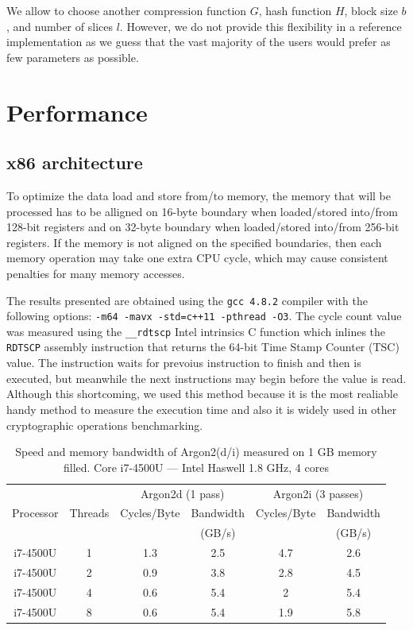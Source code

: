 \documentclass[a4paper]{article}
\begin{document}
We allow to choose another compression function $G$, hash function $H$, block size $b$, and number of slices $l$. However, we do not provide this flexibility in a reference implementation as we guess that
the vast majority of the users would prefer as few parameters as possible.



\section{Performance}

\subsection{x86 architecture}
To optimize the data load and store from/to memory, the memory that will be processed has to be alligned on 16-byte boundary when loaded/stored into/from 128-bit registers and on 32-byte boundary when loaded/stored into/from 256-bit registers. If the memory is not aligned on the specified boundaries, then each memory operation may take one extra CPU cycle, which may cause consistent penalties for many memory accesses.


The results presented are obtained using the \texttt{gcc 4.8.2} compiler  with the following options: \texttt{-m64 -mavx -std=c++11 -pthread -O3}.
The cycle count value was measured using the \texttt{\_\_rdtscp} Intel intrinsics C function which inlines the \texttt{RDTSCP} assembly instruction that returns the 64-bit Time Stamp Counter (TSC) value. The instruction waits for prevoius instruction to finish and then is executed, but meanwhile the next instructions may begin before the value is read. Although this shortcoming, we used this method because it is the most realiable handy method to measure the execution time and also it is widely used in other cryptographic operations benchmarking.

\begin{table}
\begin{center}
\begin{tabular}{|cc||cc|cc|}
\hline
& & \multicolumn{2}{c|}{\textsf{Argon2d} (1 pass)} & \multicolumn{2}{|c|}{\textsf{Argon2i} (3 passes)}  \\
\cline{3-6}
Processor & Threads & Cycles/Byte & Bandwidth & Cycles/Byte & Bandwidth \\
& & & (GB/s) & & (GB/s)\\
\hline
 i7-4500U & 1 &1.3 & 2.5 & 4.7 & 2.6 \\
\hline
 i7-4500U & 2 &0.9& 3.8&2.8 & 4.5\\
\hline
 i7-4500U & 4 &0.6 & 5.4 & 2 & 5.4 \\
\hline
 i7-4500U & 8 & 0.6 & 5.4 & 1.9 & 5.8\\
\hline
\end{tabular}
\end{center}
\caption{Speed and memory bandwidth of Argon2(d/i) measured on 1 GB memory filled. Core i7-4500U --- Intel Haswell 1.8 GHz, 4 cores}
\label{table:cycle_per_byte_results}
\end{table}
\end{document}
